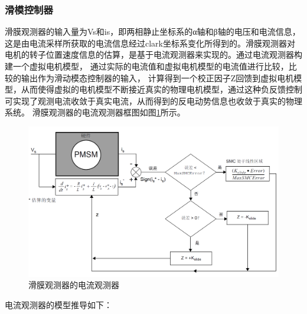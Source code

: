 ﻿\documentclass[12pt,a4paper]{article}
\begin{document}
\subsubsection{滑模控制器}
滑膜观测器的输入量为Vs和is，即两相静止坐标系的α轴和β轴的电压和电流信息，这是由电流采样所获取的电流信息经过clark坐标系变化所得到的。滑膜观测器对电机的转子位置速度信息的估算，是基于电流观测器来实现的。通过电流观测器构建一个虚拟电机模型，
通过实际的电流值和虚拟电机模型的电流值进行比较，比较的输出作为滑动模态控制器的输入，
计算得到一个校正因子Z回馈到虚拟电机模型，从而使得虚拟的电机模型不断接近真实的物理电机模型，通过这种负反馈控制可实现了观测电流收敛于真实电流，从而得到的反电动势信息也收敛于真实的物理系统。
滑膜观测器的电流观测器框图如图\ref{Con_1}所示。
\begin{figure}
  \centering
  \includegraphics[width=\textwidth]{./picture/滑膜观测器.png}
  \caption{滑膜观测器的电流观测器}
  \label{Con_1}
\end{figure}

电流观测器的模型推导如下：
\end{document}
